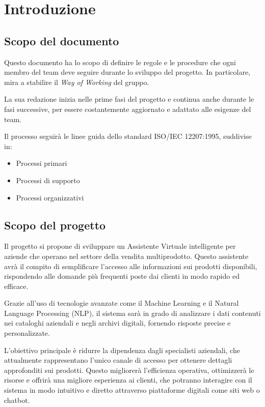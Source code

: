 \section{Introduzione}

\subsection{Scopo del documento}
Questo documento ha lo scopo di definire le regole e le procedure che ogni membro del team deve seguire durante 
lo sviluppo del progetto. In particolare, mira a stabilire il \textit{Way of Working} del gruppo. 

La sua redazione inizia nelle prime fasi del progetto e continua anche durante le fasi successive, 
per essere costantemente aggiornato e adattato alle esigenze del team. 

Il processo seguirà le linee guida dello standard ISO/IEC 12207:1995, suddivise in:
\begin{itemize}
    \item Processi primari
    \item Processi di supporto
    \item Processi organizzativi
\end{itemize}


\subsection{Scopo del progetto}
Il progetto si propone di sviluppare un Assistente Virtuale intelligente per aziende che operano nel 
settore della vendita multiprodotto. Questo assistente avrà il compito di semplificare l'accesso alle 
informazioni sui prodotti disponibili, rispondendo alle domande più frequenti poste dai clienti in modo rapido ed efficace.

Grazie all'uso di tecnologie avanzate come il Machine Learning e il Natural Language Processing (NLP), 
il sistema sarà in grado di analizzare i dati contenuti nei cataloghi aziendali e negli archivi digitali, 
fornendo risposte precise e personalizzate.

L’obiettivo principale è ridurre la dipendenza dagli specialisti aziendali, che attualmente rappresentano 
l’unico canale di accesso per ottenere dettagli approfonditi sui prodotti. Questo migliorerà l’efficienza 
operativa, ottimizzerà le risorse e offrirà una migliore esperienza ai clienti, che potranno interagire con 
il sistema in modo intuitivo e diretto attraverso piattaforme digitali come siti web o chatbot.

